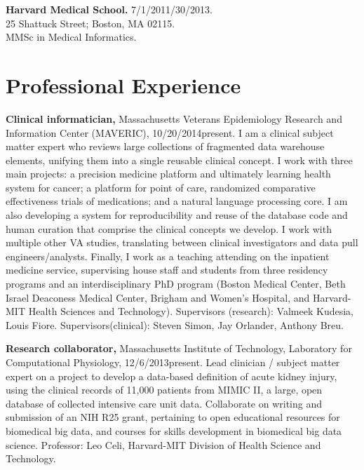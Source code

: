 \documentclass[12pt]{article}
\begin{document}
\textbf{Harvard Medical School.} 7/1/2011/30/2013.\\
25 Shattuck Street; Boston, MA 02115.\\
MMSc in Medical Informatics.

\section*{Professional Experience} %

\textbf{Clinical informatician,} Massachusetts Veterans Epidemiology
Research and Information Center (MAVERIC), 10/20/2014\ndash{}present.
I am a clinical subject matter expert who reviews large collections of
fragmented data warehouse elements, unifying them into a single
reusable clinical concept. I work with three main projects: a
precision medicine platform and ultimately learning health system for
cancer; a platform for point of care, randomized comparative
effectiveness trials of medications; and a natural language processing
core. I am also developing a system for reproducibility and reuse of
the database code and human curation that comprise the clinical
concepts we develop. I work with multiple other VA studies,
translating between clinical investigators and data pull
engineers/analysts. Finally, I work as a teaching attending on the
inpatient medicine service, supervising house staff and students from
three residency programs and an interdisciplinary PhD program (Boston
Medical Center, Beth Israel Deaconess Medical Center, Brigham and
Women's Hospital, and Harvard-MIT Health Sciences and Technology).
Supervisors (research): Valmeek Kudesia, Louis Fiore.
Supervisors(clinical): Steven Simon, Jay Orlander, Anthony Breu.

\textbf{Research collaborator,} Massachusetts Institute of Technology,
Laboratory for Computational Physiology, 12/6/2013\ndash{}present.
Lead clinician / subject matter expert on a project to develop a
data-based definition of acute kidney injury, using the clinical
records of 11,000 patients from MIMIC II, a large, open database of
collected intensive care unit data. Collaborate on writing and
submission of an NIH R25 grant, pertaining to open educational
resources for biomedical big data, and courses for skills development
in biomedical big data science. Professor: Leo Celi, Harvard-MIT
Division of Health Science and Technology.
\end{document}
